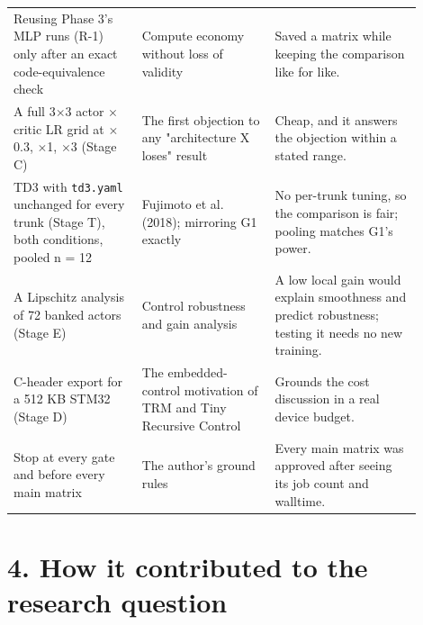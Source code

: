 \documentclass[11pt]{article}
\begin{document}
\begin{center}
\begin{tabular}{>{\raggedright\arraybackslash}p{0.287\linewidth}>{\raggedright\arraybackslash}p{0.291\linewidth}>{\raggedright\arraybackslash}p{0.327\linewidth}}
Reusing Phase 3's MLP runs (R-1) only after an exact code-equivalence check & Compute economy without loss of validity & Saved a matrix while keeping the comparison like for like. \\
A full 3$\times$3 actor $\times$ critic LR grid at $\times$0.3, $\times$1, $\times$3 (Stage C) & The first objection to any "architecture X loses" result & Cheap, and it answers the objection within a stated range. \\
TD3 with \texttt{td3.yaml} unchanged for every trunk (Stage T), both conditions, pooled n = 12 & Fujimoto et al. (2018); mirroring G1 exactly & No per-trunk tuning, so the comparison is fair; pooling matches G1's power. \\
A Lipschitz analysis of 72 banked actors (Stage E) & Control robustness and gain analysis & A low local gain would explain smoothness and predict robustness; testing it needs no new training. \\
C-header export for a 512 KB STM32 (Stage D) & The embedded-control motivation of TRM and Tiny Recursive Control & Grounds the cost discussion in a real device budget. \\
Stop at every gate and before every main matrix & The author's ground rules & Every main matrix was approved after seeing its job count and walltime. \\
\bottomrule
\end{tabular}\end{center}



\section*{4. How it contributed to the research question}
\end{document}
